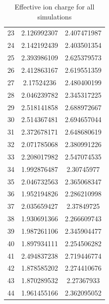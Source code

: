 \begin{table}
\begin{tabular}{c|c|c}
		23 & 2.126992307 & 2.407471987 \\ 
		24 & 2.142192439 & 2.403501354 \\ 
		25 & 2.393986109 & 2.625379573 \\ 
		26 & 2.412863167 & 2.619551359 \\ 
		27 & 2.17524236 & 2.480400199 \\ 
		28 & 2.046239782 & 2.345317225 \\ 
		29 & 2.518141858 & 2.688972667 \\ 
		30 & 2.514367481 & 2.694657044 \\
		31 & 2.372678171 & 2.648680619 \\ 
		32 & 2.071785068 & 2.380991226 \\ 
		33 & 2.208017982 & 2.547074535 \\ 
		34 & 1.992876487 & 2.30745977 \\ 
		35 & 2.046732563 & 2.365068347 \\ 
		36 & 1.952194826 & 2.286210998 \\ 
		37 & 2.035659427 & 2.37849725 \\ 
		38 & 1.930691366 & 2.266609743 \\ 
		39 & 1.987261106 & 2.345904477 \\ 
		40 & 1.897934111 & 2.254506282 \\ 
		41 & 2.494837238 & 2.719446774 \\ 
		42 & 1.878585202 & 2.274410676 \\ 
		43 & 1.870289532 & 2.27367933 \\ 
		44 & 1.961455166 & 2.362095052 \\ \hline
	\end{tabular}
	\caption{Effective ion charge for all simulations}
	\label{tab:Zeff}
\end{table}


